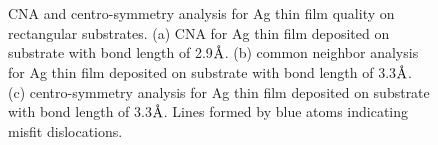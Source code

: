 \begingroup
\begin{figure}[!ht]
  \centering
  \label{Chap:Ag/ZnO:fig:9a}
  \\
  \label{Chap:Ag/ZnO:fig:9b}
  \\
  \label{Chap:Ag/ZnO:fig:9c}
\caption[Common neighbor analysis and centro-symmetry analysis for Ag thin film quality on rectangular substrates.]{\ac{CNA} and centro-symmetry analysis for Ag thin film quality on rectangular substrates. (a) \ac{CNA} for Ag thin film deposited on substrate with bond length of 2.9$\mbox{\normalfont\AA}$. (b) common neighbor analysis for Ag thin film deposited on substrate with bond length of 3.3$\mbox{\normalfont\AA}$. (c) centro-symmetry analysis for Ag thin film deposited on substrate with bond length of 3.3$\mbox{\normalfont\AA}$. Lines formed by blue atoms indicating misfit dislocations.}
  \label{Chap:Ag/ZnO:fig9}
\end{figure}
\endgroup

